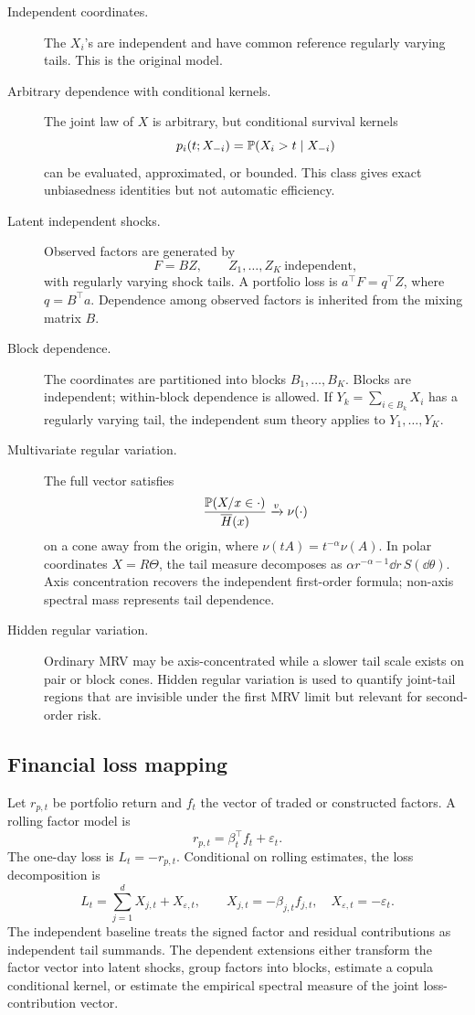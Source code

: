\begin{description}
\item[Independent coordinates.] The \(X_i\)'s are independent and have common
reference regularly varying tails. This is the original model.

\item[Arbitrary dependence with conditional kernels.] The joint law of \(X\) is
arbitrary, but conditional survival kernels
\[
  p_i(t;X_{-i})=\mathbb{P}(X_i>t\mid X_{-i})
\]
can be evaluated, approximated, or bounded. This class gives exact
unbiasedness identities but not automatic efficiency.

\item[Latent independent shocks.] Observed factors are generated by
\[
  F=BZ, \qquad Z_1,\ldots,Z_K\ \text{independent},
\]
with regularly varying shock tails. A portfolio loss is \(a^\top F=q^\top Z\),
where \(q=B^\top a\). Dependence among observed factors is inherited from the
mixing matrix \(B\).

\item[Block dependence.] The coordinates are partitioned into blocks
\(B_1,\ldots,B_K\). Blocks are independent; within-block dependence is allowed.
If \(Y_k=\sum_{i\in B_k}X_i\) has a regularly varying tail, the independent
sum theory applies to \(Y_1,\ldots,Y_K\).

\item[Multivariate regular variation.] The full vector satisfies
\[
  \frac{\mathbb{P}(X/x\in\cdot)}{\overline{H}(x)}\xrightarrow{v}\nu(\cdot)
\]
on a cone away from the origin, where \(\nu(tA)=t^{-\alpha}\nu(A)\). In polar
coordinates \(X=R\Theta\), the tail measure decomposes as
\(\alpha r^{-\alpha-1}\dd r\,S(\dd\theta)\). Axis concentration recovers the
independent first-order formula; non-axis spectral mass represents tail
dependence.

\item[Hidden regular variation.] Ordinary MRV may be axis-concentrated while a
slower tail scale exists on pair or block cones. Hidden regular variation is
used to quantify joint-tail regions that are invisible under the first MRV
limit but relevant for second-order risk.
\end{description}

\subsection{Financial loss mapping}

Let \(r_{p,t}\) be portfolio return and \(f_t\) the vector of traded or
constructed factors. A rolling factor model is
\[
  r_{p,t}=\beta_t^\top f_t+\varepsilon_t.
\]
The one-day loss is \(L_t=-r_{p,t}\). Conditional on rolling estimates, the
loss decomposition is
\[
  L_t=\sum_{j=1}^d X_{j,t}+X_{\varepsilon,t},
  \qquad
  X_{j,t}=-\beta_{j,t}f_{j,t}, \quad
  X_{\varepsilon,t}=-\varepsilon_t.
\]
The independent baseline treats the signed factor and residual contributions as
independent tail summands. The dependent extensions either transform the factor
vector into latent shocks, group factors into blocks, estimate a copula
conditional kernel, or estimate the empirical spectral measure of the joint
loss-contribution vector.

